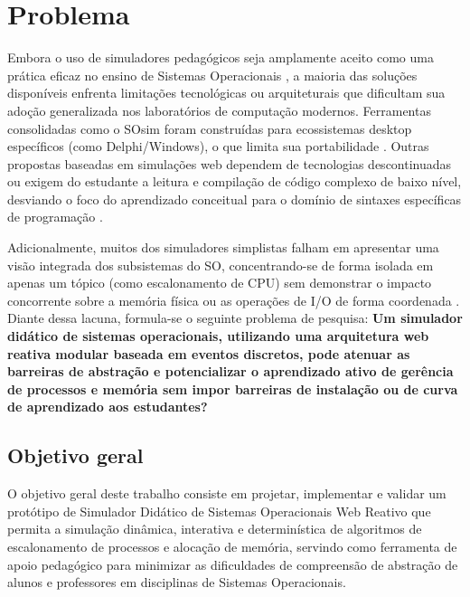 \section{Problema}
Embora o uso de simuladores pedagógicos seja amplamente aceito como uma prática eficaz no ensino de Sistemas Operacionais \cite{maziero2002reflexoes}, a maioria das soluções disponíveis enfrenta limitações tecnológicas ou arquiteturais que dificultam sua adoção generalizada nos laboratórios de computação modernos. Ferramentas consolidadas como o SOsim \cite{maia2001sosim} foram construídas para ecossistemas desktop específicos (como Delphi/Windows), o que limita sua portabilidade \cite{reis2009tbcso, scamati2017esorv}. Outras propostas baseadas em simulações web dependem de tecnologias descontinuadas ou exigem do estudante a leitura e compilação de código complexo de baixo nível, desviando o foco do aprendizado conceitual para o domínio de sintaxes específicas de programação \cite{ribeiro2014simulador, moraes2010simulador}.

Adicionalmente, muitos dos simuladores simplistas falham em apresentar uma visão integrada dos subsistemas do SO, concentrando-se de forma isolada em apenas um tópico (como escalonamento de CPU) sem demonstrar o impacto concorrente sobre a memória física ou as operações de I/O de forma coordenada \cite{maziero2002reflexoes, dutra2026pampasim}. Diante dessa lacuna, formula-se o seguinte problema de pesquisa: \textbf{Um simulador didático de sistemas operacionais, utilizando uma arquitetura web reativa modular baseada em eventos discretos, pode atenuar as barreiras de abstração e potencializar o aprendizado ativo de gerência de processos e memória sem impor barreiras de instalação ou de curva de aprendizado aos estudantes?}

\subsection{Objetivo geral}
O objetivo geral deste trabalho consiste em projetar, implementar e validar um protótipo de Simulador Didático de Sistemas Operacionais Web Reativo que permita a simulação dinâmica, interativa e determinística de algoritmos de escalonamento de processos e alocação de memória, servindo como ferramenta de apoio pedagógico para minimizar as dificuldades de compreensão de abstração de alunos e professores em disciplinas de Sistemas Operacionais.

